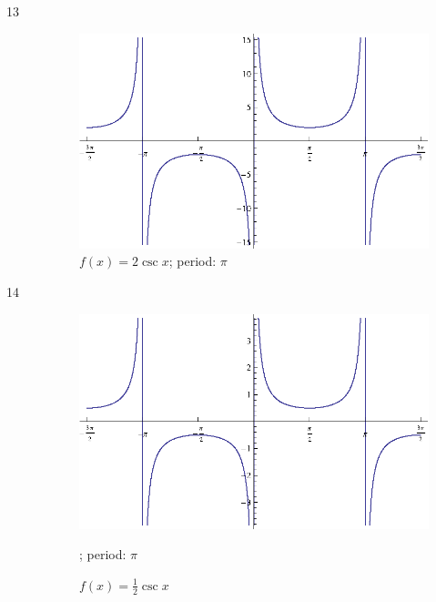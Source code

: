 \documentclass{exam}
\begin{document}
\begin{description}
      \item[13]
        \begin{figure}[H]
          \centering
          \includegraphics[scale=0.9]{exercise13.eps}
          \caption{$f(x) = 2 \csc x$; period: $\pi$}
        \end{figure}

      \item[14]
        \begin{figure}[H]
          \centering
          \includegraphics[scale=0.9]{exercise14.eps}
          \caption{$f(x) = \frac{1}{2} \csc x$}; period: $\pi$
        \end{figure}


\end{description}
\end{document}
